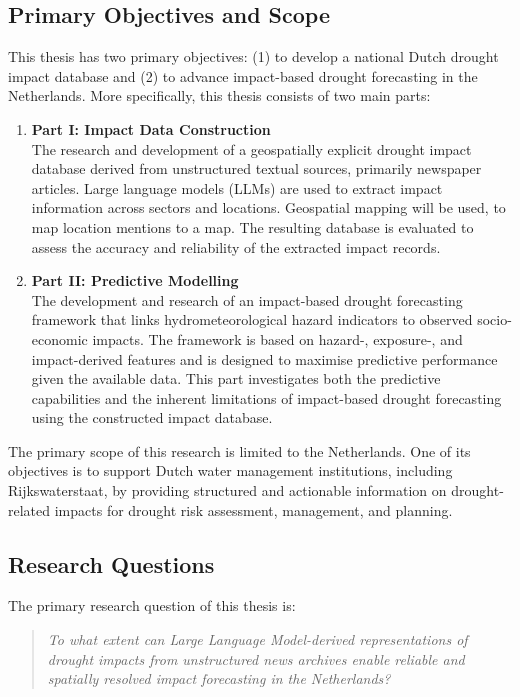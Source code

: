 \subsection{Primary Objectives and Scope}

This thesis has two primary objectives: (1) to develop a national Dutch drought impact database and (2) to advance impact-based drought forecasting in the Netherlands. More specifically, this thesis consists of two main parts:

\begin{enumerate}
    \item \textbf{Part I: Impact Data Construction} \\
    The research and development of a geospatially explicit drought impact database derived from unstructured textual sources, primarily newspaper articles. Large language models (LLMs) are used to extract impact information across sectors and locations. Geospatial mapping will be used, to map location mentions to a map. The resulting database is evaluated to assess the accuracy and reliability of the extracted impact records.

    \item \textbf{Part II: Predictive Modelling} \\
    The development and research  of an impact-based drought forecasting framework that links hydrometeorological hazard indicators to observed socio-economic impacts. The framework is based on hazard-, exposure-, and impact-derived features and is designed to maximise predictive performance given the available data. This part investigates both the predictive capabilities and the inherent limitations of impact-based drought forecasting using the constructed impact database.
\end{enumerate}

The primary scope of this research is limited to the Netherlands. One of its objectives is to support Dutch water management institutions, including Rijkswaterstaat, by providing structured and actionable information on drought-related impacts for drought risk assessment, management, and planning.

\subsection{Research Questions}

The primary research question of this thesis is:

\begin{quote}
\textit{To what extent can Large Language Model-derived representations of drought impacts from unstructured news archives enable reliable and spatially resolved impact forecasting in the Netherlands?}
\end{quote}


